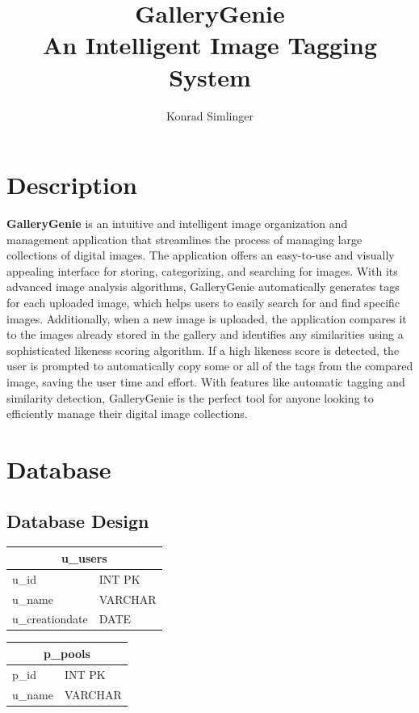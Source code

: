 \documentclass[a4paper,12pt]{article}
\author{Konrad Simlinger}
\title{GalleryGenie \\
		An Intelligent Image Tagging System}
\newcommand{\imgal}{GalleryGenie}
\begin{document}
\maketitle
\newpage
\tableofcontents
\newpage

\section{Description}
\textbf{\imgal{}} is an intuitive and intelligent image organization and management application that streamlines the process of managing large collections of digital images. The application offers an easy-to-use and visually appealing interface for storing, categorizing, and searching for images. With its advanced image analysis algorithms, \imgal{} automatically generates tags for each uploaded image, which helps users to easily search for and find specific images. Additionally, when a new image is uploaded, the application compares it to the images already stored in the gallery and identifies any similarities using a sophisticated likeness scoring algorithm. If a high likeness score is detected, the user is prompted to automatically copy some or all of the tags from the compared image, saving the user time and effort. With features like automatic tagging and similarity detection, \imgal{} is the perfect tool for anyone looking to efficiently manage their digital image collections.

\newpage
\section{Database}
\subsection{Database Design}

\begin{table}[h]
	\begin{tabular}{ll}
		\multicolumn{2}{c}{u\_users}                   \\ \hline
		\multicolumn{1}{l|}{u\_id}           & INT PK     \\
		\multicolumn{1}{l|}{u\_name}         & VARCHAR \\
		\multicolumn{1}{l|}{u\_creationdate} & DATE   
	\end{tabular}
\end{table}

\begin{table}[h]
	\begin{tabular}{ll}
		\multicolumn{2}{c}{p\_pools}           \\ \hline
		\multicolumn{1}{l|}{p\_id}   & INT PK     \\
		\multicolumn{1}{l|}{u\_name} & VARCHAR
	\end{tabular}
\end{table}
\end{document}
